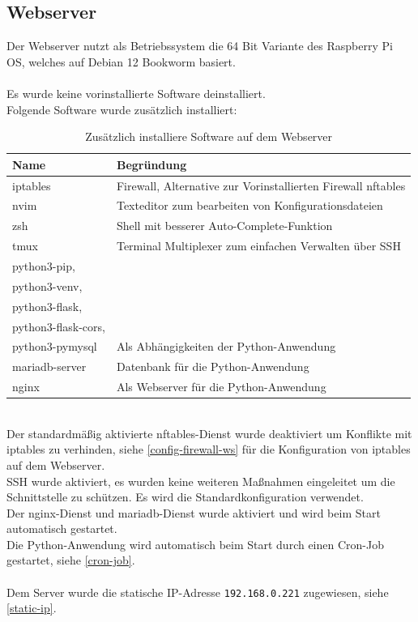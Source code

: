 \documentclass[
    a4paper,
    pagesize,
	pdftex,
    12pt,
]{scrartcl}
\begin{document}
\subsection{Webserver}
Der Webserver nutzt als Betriebssystem die 64 Bit Variante des Raspberry Pi OS, welches auf Debian 12 Bookworm basiert. \\ \\ 
Es wurde keine vorinstallierte Software deinstalliert.\\
Folgende Software wurde zusätzlich installiert: 
\begin{table}[h!]
	\begin{center}
		\label{tab:table2}
		\begin{tabular}{l|l }
			\textbf{Name} & \textbf{Begründung} \\
			\hline
			iptables & Firewall, Alternative zur Vorinstallierten Firewall nftables \\
			nvim & Texteditor zum bearbeiten von Konfigurationsdateien \\
			zsh & Shell mit besserer Auto-Complete-Funktion \\
			tmux & Terminal Multiplexer zum einfachen Verwalten über SSH \\
			python3-pip,\\ python3-venv, \\ python3-flask,\\ python3-flask-cors, \\ python3-pymysql & Als Abhängigkeiten der Python-Anwendung \\
			mariadb-server & Datenbank für die Python-Anwendung \\
			nginx & Als Webserver für die Python-Anwendung \\
		\end{tabular}
		\caption{Zusätzlich installiere Software auf dem Webserver}
	\end{center}
\end{table}
\\
Der standardmäßig aktivierte nftables-Dienst wurde deaktiviert um Konflikte mit iptables zu verhinden, siehe  \ref{config-firewall-ws} für die Konfiguration von iptables auf dem Webserver. \\
SSH wurde aktiviert, es wurden keine weiteren Maßnahmen eingeleitet um die Schnittstelle zu  schützen. Es wird die Standardkonfiguration verwendet. \\
Der nginx-Dienst und mariadb-Dienst wurde aktiviert und wird beim Start automatisch gestartet. \\
Die Python-Anwendung wird automatisch beim Start durch einen Cron-Job gestartet, siehe  \ref{cron-job}. \\ \\
Dem Server wurde die statische IP-Adresse \lstinline[breaklines]|192.168.0.221| zugewiesen, siehe  \ref{static-ip}.
\end{document}
